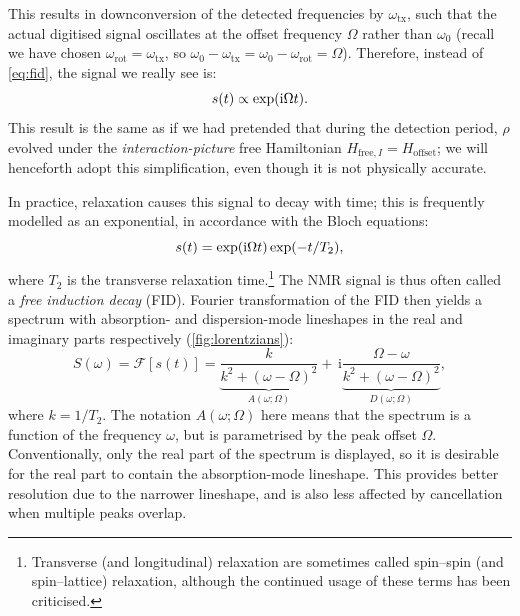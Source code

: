 This results in downconversion of the detected frequencies by $\omega_\text{tx}$, such that the actual digitised signal oscillates at the offset frequency $\Omega$ rather than $\omega_0$ (recall we have chosen $\omega_\text{rot} = \omega_\text{tx}$, so $\omega_0 - \omega_\text{tx} = \omega_0 - \omega_\text{rot} = \Omega$).
Therefore, instead of \cref{eq:fid}, the signal we really see is:
\begin{equation}
    \label{eq:fid_reduced}
    s(t) \propto \exp(\mathrm{i} \Omega t).
\end{equation}
This result is the same as if we had pretended that during the detection period, $\rho$ evolved under the \textit{interaction-picture} free Hamiltonian $H_{\text{free},I} = H_\text{offset}$; we will henceforth adopt this simplification, even though it is not physically accurate.

In practice, relaxation causes this signal to decay with time; this is frequently modelled as an exponential, in accordance with the Bloch equations\autocite{Bloch1946PR}:
\begin{equation}
    \label{eq:fid_with_relaxation}
    s(t) = \exp(\mathrm{i}\Omega t)\exp(-t/T_2),
\end{equation}
where $T_2$ is the transverse relaxation time.\footnote{Transverse (and longitudinal) relaxation are sometimes called spin--spin (and spin--lattice) relaxation, although the continued usage of these terms has been criticised\autocite{Levitt2008,Keeler2010,Gupta2021JPCL}.}
The NMR signal is thus often called a \textit{free induction decay} (FID).
Fourier transformation of the FID then yields a spectrum with absorption- and dispersion-mode lineshapes in the real and imaginary parts respectively (\cref{fig:lorentzians}):
\begin{equation}
    \label{eq:lorentzian}
    S(\omega) = \mathcal{F}[s(t)] =
    \underbrace{\frac{k}{k^2 + (\omega - \Omega)^2}}_{A(\omega; \Omega)}
    +\, \mathrm{i}\underbrace{\frac{\Omega - \omega}{k^2 + (\omega - \Omega)^2}}_{D(\omega; \Omega)},
\end{equation}
where $k = 1/T_2$.
The notation $A(\omega; \Omega)$ here means that the spectrum is a function of the frequency $\omega$, but is parametrised by the peak offset $\Omega$.
Conventionally, only the real part of the spectrum is displayed, so it is desirable for the real part to contain the absorption-mode lineshape.
This provides better resolution due to the narrower lineshape, and is also less affected by cancellation when multiple peaks overlap.

